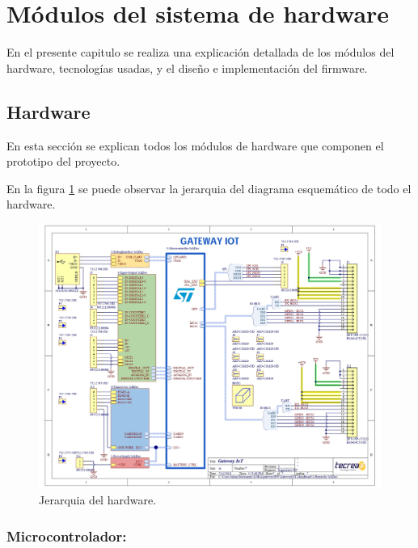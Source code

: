 \section{Módulos del sistema de hardware}
 
En el presente capitulo se realiza una explicación detallada de los módulos del hardware, tecnologías usadas, y el diseño e implementación del firmware.


\subsection{Hardware}

En esta sección se explican todos los módulos de hardware que componen el prototipo del proyecto.

En la figura \ref{fig:Hierarchy} se puede observar la jerarquia del diagrama esquemático de todo el hardware.

\begin{figure}[h]
	\centering
	\includegraphics[scale=.6]{./Figures/Hierarchy.jpg}
	\caption{Jerarquia del hardware.}
	\label{fig:Hierarchy}
\end{figure}

\subsubsection{Microcontrolador:}

